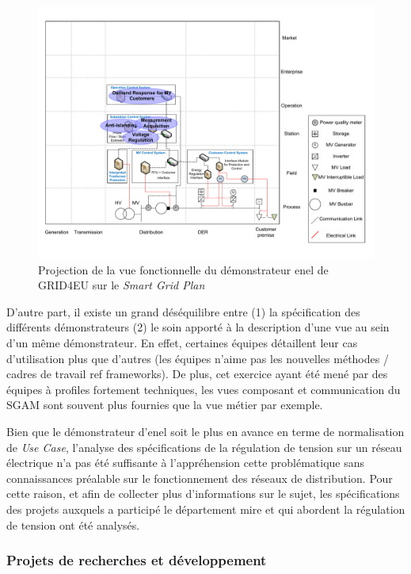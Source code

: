 \begin{figure}[!ht]
 	\begin{center}
	 \includegraphics[trim=0cm 1cm 0cm 1cm, width=1\textwidth]{figures/4_demarche/enel.pdf}
	\end{center}
	\caption{Projection de la vue fonctionnelle du démonstrateur \gls{enel} de
GRID4EU sur le \textit{Smart Grid Plan}} \label{fig:enel_sgplan}
\end{figure}

D'autre part, il existe un grand déséquilibre entre (1) la spécification des
différents démonstrateurs (2) le soin apporté à la description d'une vue au sein
d'un même démonstrateur. En effet, certaines équipes détaillent leur cas
d'utilisation plus que d'autres (les équipes n'aime pas les nouvelles méthodes /
cadres de travail ref frameworks). De plus, cet exercice ayant été mené par des
équipes à profiles fortement techniques, les vues composant et communication du
SGAM sont souvent plus fournies que la vue métier par exemple.

Bien que le démonstrateur d'\gls{enel} soit le plus en avance en terme de
normalisation de \textit{Use Case}, l'analyse des spécifications de la
régulation de tension sur un réseau électrique n'a pas été suffisante à
l'appréhension cette problématique sans connaissances préalable sur le
fonctionnement des réseaux de distribution. Pour cette raison, et afin de
collecter plus d'informations sur le sujet, les spécifications des projets
auxquels a participé le département \gls{mire} et qui abordent la régulation de
tension ont été analysés.


\subsubsection{Projets de recherches et développement}

